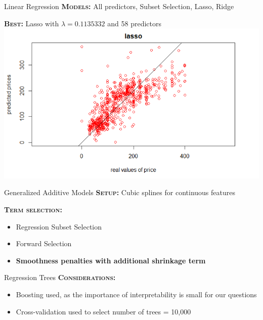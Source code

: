 \documentclass[10pt]{beamer}
\begin{document}
    \begin{frame}{Linear Regression}
    	\textbf{\textsc{Models:}} All predictors, Subset Selection, Lasso, Ridge
    
        \textbf{\textsc{Best:}} Lasso with $\lambda = 0.1135332$ and 58 predictors
        \includegraphics[width=\textwidth]{lasso.PNG}
    \end{frame}
    
	\begin{frame}{Generalized Additive Models}
		\textbf{\textsc{Setup:}} Cubic splines for continuous features
    
        \textbf{\textsc{Term selection:}}
        	\begin{itemize}
        		\item Regression Subset Selection
                \item Forward Selection
                \item \textbf{Smoothness penalties with additional shrinkage term}
        	\end{itemize}
    \end{frame}
    
    \begin{frame}{Regression Trees}
    	\textbf{\textsc{Considerations:}}
        \begin{itemize}
          \item Boosting used, as the importance of interpretability is small for our questions
          \item Cross-validation used to select number of trees = 10,000 
        \end{itemize} 
    	
    \end{frame}
    
\end{document}
